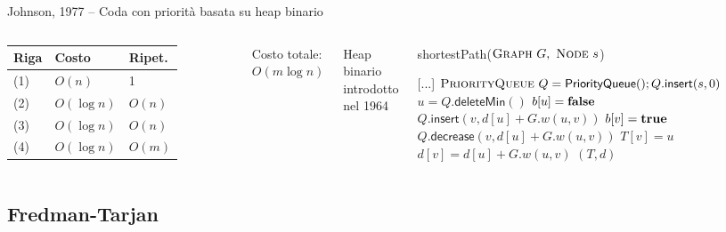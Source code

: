 \begin{frame}{Johnson, 1977 -- Coda con priorità basata su heap binario}


\vspace{-9pt}

\begin{columns}

\begingroup
\renewcommand*{\arraystretch}{1.2}
\begin{tabular}{|l|l|l|}
\hline
Riga & Costo & Ripet. \\\hline
(1) & $O(n)$ & 1 \\\hline
(2) & $O(\log n)$ & $O(n)$ \\\hline
(3) & $O(\log n)$ & $O(n)$ \\\hline
(4) & $O(\log n)$ & $O(m)$ \\\hline
\end{tabular}
\endgroup

\medskip
Costo totale: \alert{$O(m \log n)$}

\medskip
Heap binario introdotto nel 1964

\vspace{-12pt}
\tiny
\begin{Procedure}
\caption[A]{\textsf{shortestPath}($\textsc{Graph}\ G,\ \textsc{Node}\ s$)}
[...]\;
\alert{$\textsc{PriorityQueue}\ Q = \textsf{PriorityQueue}(); Q.\textsf{insert}(s, 0)$}\;
{
  \alert{$u = Q.\textsf{deleteMin}()$}\;
  $b[u] = \FALSE$\;
  {
    {
      {
        \alert{$Q.\textsf{insert}(v, d[u]+G.w(u,v))$}\;
        $b[v] = \TRUE$\;
      }
      {
        \alert{$Q.\textsf{decrease}(v, d[u]+G.w(u,v))$}
      }
      $T[v] = u$\;
      $d[v] = d[u] + G.w(u,v)$\;
    }
  }
}
\Return $(T,d)$
\end{Procedure}
\end{columns}



\end{frame}

\subsection{Fredman-Tarjan}


